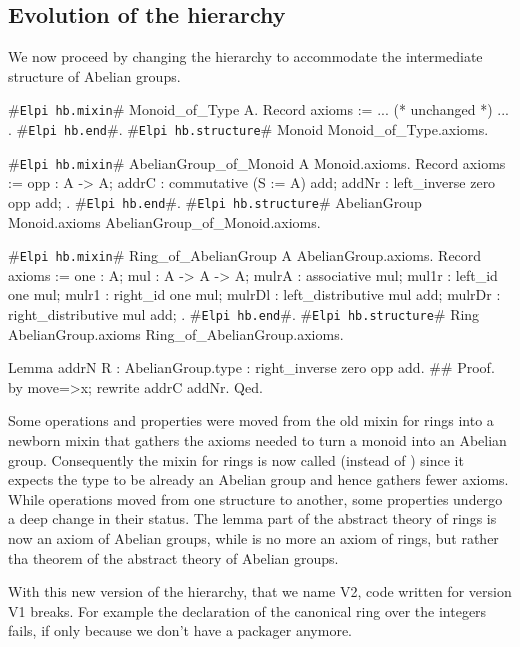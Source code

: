 \documentclass[a4paper,UKenglish,cleveref, autoref]{lipics-v2019}
\newcommand{\mixin}{mixin}
\newcommand{\packager}{packager}
\newcommand{\hbmixin}{{\tt\color{dkgreen}Elpi hb.mixin}}
\newcommand{\hbstructure}{{\tt\color{dkgreen}Elpi hb.structure}}
\newcommand{\hbend}{{\tt\color{dkgreen}Elpi hb.end}}
\theoremstyle{implem}
\theoremstyle{implem}
\theoremstyle{command}
\begin{document}
\subsection{Evolution of the hierarchy}\label{subsec:evolution}

We now proceed by changing the hierarchy to accommodate the intermediate
structure of Abelian groups.

\begin{coqcode}
#\hbmixin{}# Monoid_of_Type A.
  Record axioms := { ... (* unchanged *) ... }.
#\hbend{}#.
#\hbstructure{}# Monoid Monoid_of_Type.axioms.

#\hbmixin{}# AbelianGroup_of_Monoid A Monoid.axioms.
  Record axioms := {
    opp : A -> A;
    addrC : commutative (S := A) add;
    addNr : left_inverse zero opp add;
  }.
#\hbend{}#.
#\hbstructure{}# AbelianGroup Monoid.axioms AbelianGroup_of_Monoid.axioms.

#\hbmixin{}# Ring_of_AbelianGroup A AbelianGroup.axioms.
  Record axioms := {
    one : A;
    mul : A -> A -> A;
    mulrA : associative mul;
    mul1r : left_id one mul;
    mulr1 : right_id one mul;
    mulrDl : left_distributive mul add;
    mulrDr : right_distributive mul add;
  }.
#\hbend{}#.
#\hbstructure{}# Ring AbelianGroup.axioms Ring_of_AbelianGroup.axioms.

Lemma addrN {R : AbelianGroup.type} : right_inverse zero opp add.               #\label{demo2:proof:addrN}#
Proof. by move=>x; rewrite addrC addNr. Qed.
\end{coqcode}

Some operations and properties were moved from the old \mixin{} for rings
into a newborn \mixin{}  that gathers the
axioms needed to turn a monoid into an Abelian group. Consequently the \mixin{}
for rings is now called  (instead of )
since it expects the type  to be already an Abelian group and hence
gathers fewer axioms. \\
While operations moved from one structure to another, some properties
undergo a deep change in their status.
The lemma  part of the abstract theory of
rings is now an axiom of Abelian groups, while  is no more
an axiom of rings, but rather tha theorem of the abstract theory of Abelian
groups.

With this new version of the hierarchy, that we name V2, code written
for version V1 breaks. For example the declaration of the canonical ring over 
the integers fails, if only
because we don't have a  \packager{} anymore.
\end{document}
